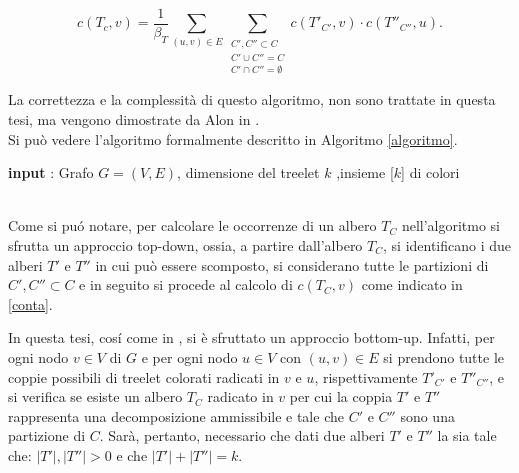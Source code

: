 \begin{equation}\label{conta}
	c(T_c,v)=\frac{1}{\beta_T}\sum_{(u,v)\in E}\sum_{\substack{C', C'' \subset C \\C' \cup C'' = C  \\ C' \cap C'' = \emptyset}}c(T'_{C'},v)\cdot c(T''_{C''},u).
\end{equation}

 La correttezza e la complessit\`a di questo algoritmo, non sono trattate in questa tesi, ma vengono dimostrate da Alon in \cite{alon1995color}.\\
 Si pu\`o vedere l'algoritmo formalmente  descritto in Algoritmo \ref{algoritmo}.


\begin{algorithm}[H]
	\label{algoritmo}
	\SetAlgoLined
 	\textbf{input} : Grafo $ G =(V,E) $, dimensione del treelet $ k $ ,insieme [$ k $] di colori\;	
 			
\end{algorithm}\mbox{}\\

Come si pu\'o notare, per calcolare le occorrenze di un albero $ T_C $ nell'algoritmo si sfrutta un approccio top-down, ossia, a partire dall'albero $ T_C $, si identificano i due alberi $ T' $ e $ T'' $ in cui pu\`o essere scomposto, si considerano tutte le partizioni di $ C',C'' \subset C $ e in seguito si procede al calcolo di $ c(T_C,v) $ come indicato in \eqref{conta}.

In questa tesi, cos\'i come in \cite{bressan2019motivo}, si \`e sfruttato un approccio bottom-up. Infatti, per ogni nodo $ v \in V $ di $ G $ e per ogni nodo $ u \in V$ con $ (u,v)\in E $ si prendono tutte le coppie possibili di treelet colorati radicati  in $ v $ e $ u $, rispettivamente $ T'_{C'} $ e $ T''_{C''} $, e si verifica se esiste un albero $T_C$ radicato in $v$ per cui la coppia  $ T'$ e $ T''$ rappresenta una decomposizione ammissibile e tale che $C'$ e $C''$ sono una partizione di $C$.
Sar\`a, pertanto, necessario che dati due alberi $ T' $ e $ T'' $ la sia tale che: $ |T'|,|T''|>0 $ e che $ |T'| + |T''| = k $. %


